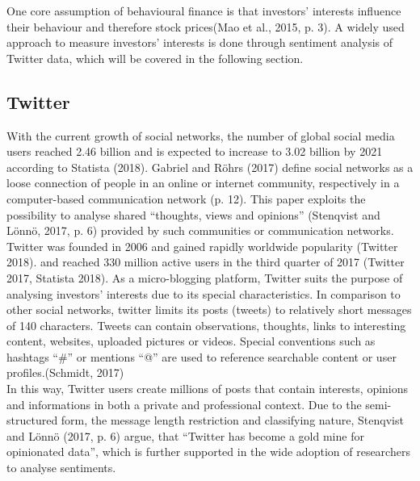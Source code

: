 \documentclass[a4paper,american,12pt]{article}
\begin{document}
\begin{spacing}{1.2}
One core assumption of behavioural finance is that investors’ interests influence their behaviour and therefore stock prices(Mao et al., 2015, p. 3). A widely used approach to measure investors’ interests is done through sentiment analysis of Twitter data, which will be covered in the following section.\\
		
\subsection{Twitter}
With the current growth of social networks, the number of global social media users reached 2.46 billion and is expected to increase to 3.02 billion by 2021 according to Statista (2018). Gabriel and Röhrs (2017) define social networks as a loose connection of people in an online or internet community, respectively in a computer-based communication network (p. 12). This paper exploits the possibility to analyse shared “thoughts, views and opinions” (Stenqvist and Lönnö, 2017, p. 6) provided by such communities or communication networks.\\

Twitter was founded in 2006 and gained rapidly worldwide popularity (Twitter 2018). and reached 330 million active users in the third quarter of 2017 (Twitter 2017, Statista 2018). As a micro-blogging platform, Twitter suits the purpose of analysing investors’ interests due to its special characteristics. In comparison to other social networks, twitter limits its posts (tweets) to relatively short messages of 140 characters. Tweets can contain observations, thoughts, links to interesting content, websites, uploaded pictures or videos. Special conventions such as hashtags “\#” or mentions “@” are used to reference searchable content or user profiles.(Schmidt, 2017)\\

In this way, Twitter users create millions of posts that contain interests, opinions and informations in both a private and professional context.  Due to the semi-structured form, the message length restriction and classifying nature, Stenqvist and Lönnö (2017, p. 6) argue, that “Twitter has become a gold mine for opinionated data”, which is further supported in the wide adoption of researchers to analyse sentiments.\\


\end{spacing}
\end{document}

